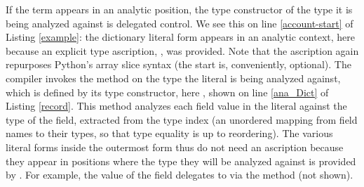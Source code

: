 If the term appears in an analytic position, the type constructor of the type it is being analyzed against is delegated control. We see this on line \ref{account-start} of Listing \ref{example}: the dictionary literal form appears in an analytic context, here because an explicit type ascription, \lstinlinep{[:Account]}, was provided. Note that the ascription again repurposes Python's array slice syntax (the start is, conveniently,  optional). The compiler invokes the  method on the type the literal is being analyzed against, which is defined by its type constructor, here , shown on line \ref{ana_Dict} of Listing \ref{record}. This method analyzes each field value in the literal against the type of the field, extracted from the type index (an unordered mapping from field names to their types, so that type equality is up to reordering). The various literal forms inside the outermost form thus do not need an ascription because they appear in positions where the type they will be analyzed against is provided by . For example, the value of the field  delegates to  via the  method (not shown).

